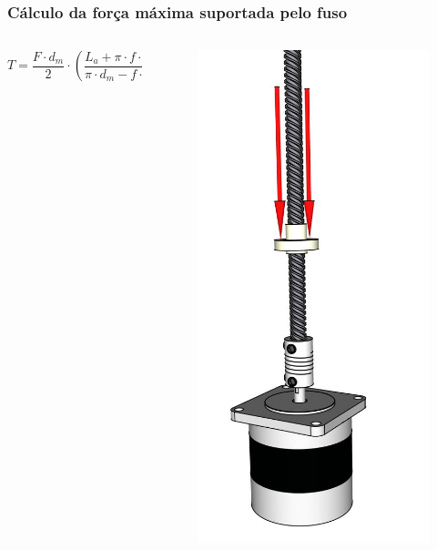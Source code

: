 \begin{frame}
\frametitle{Cálculo da força máxima suportada pelo fuso}
    \begin{columns}
        \begin{column}{0.7\textwidth}
            $$T = \frac{F \cdot d_{m}}{2} \cdot (\frac{L_{a} + \pi \cdot f \cdot d_{m}}{\pi \cdot d_{m} - f \cdot L_{a}}) + \frac{F \cdot f_{c} \cdot d_{c}}{2}$$
        \end{column}
        \begin{column}{0.3\textwidth}
            \begin{figure}
                \centering
                \includegraphics[scale = 0.15]{figuras/esqforcafuso}
            \end{figure}
        \end{column}
    \end{columns}
\end{frame}

